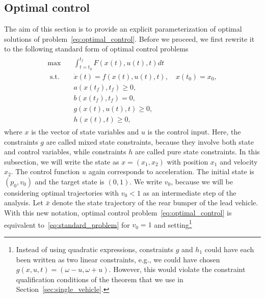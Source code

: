 \documentclass[a4paper]{article}
\theoremstyle{definition}
\theoremstyle{plain}
\begin{document}
\subsection{Optimal control}

The aim of this section is to provide an explicit parameterization of optimal
solutions of problem~\eqref{eq:optimal_control}.
%
Before we proceed, we first rewrite it to the following standard form of optimal
control problems
\begin{align}
  \label{eq:standard_problem}
  \begin{split}
  \max \quad & \int_{t=t_{0}}^{t_{f}} F(x(t), u(t), t) dt \\
  \text{ s.t. } \;\, & \dot{x}(t) = f(x(t), u(t), t) , \quad x(t_{0}) = x_{0} , \\
             & a(x(t_{f}), t_{f}) \geq 0 , \\
             & b(x(t_{f}), t_{f}) = 0 , \\
                & g(x(t), u(t), t) \geq 0 , \\
             & h(x(t), t) \geq 0 ,
  \end{split}
\end{align}
where $x$ is the vector of state variables and $u$ is the control input.
%
Here, the constraints $g$ are called mixed state constraints, because they
involve both state and control variables, while constraints $h$ are called pure
state constraints.
%
In this subsection, we will write the state as $x = (x_{1}, x_{2})$ with
position $x_{1}$ and velocity $x_{2}$. The control function $u$ again
corresponds to acceleration. The initial state is $(p_{0}, v_{0})$ and the
target state is $(0, 1)$. We write $v_{0}$, because we will be considering
optimal trajectories with $v_{0} < 1$ as an intermediate step of the analysis.
%
Let $\bar{x}$ denote the state trajectory of the rear bumper of the lead vehicle.
%
With this new notation, optimal control problem~\eqref{eq:optimal_control} is equivalent to~\eqref{eq:standard_problem} for
$v_{0} = 1$ and setting\footnote{Instead of using quadratic expressions, constraints $g$ and $h_{1}$ could have each been written as two linear constraints, e.g., we could have chosen $g(x, u, t) = (\omega - u, \omega + u)$. However, this would violate the constraint qualification conditions of the theorem that we use in Section~\ref{sec:single_vehicle}.}
\end{document}

